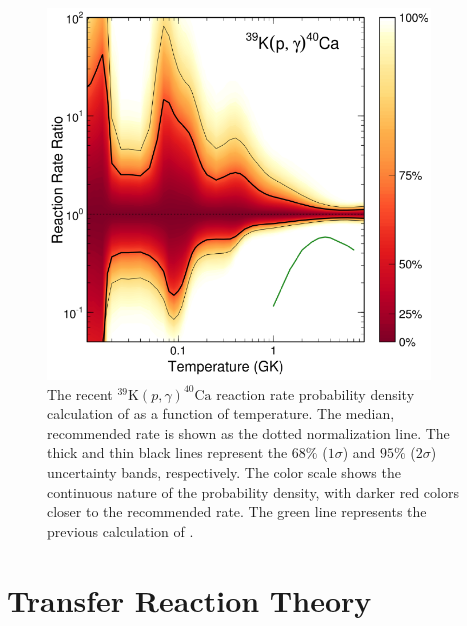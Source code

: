 \begin{figure}[t]
\centering
\includegraphics[width=4in]{Chapter-6/figs/39K_p_g_Longland2018.png}
\caption{\label{fig:39K_p_g_Longland}The recent $^{39}\mathrm{K}(p,\gamma)^{40}\mathrm{Ca}$ reaction rate probability density calculation of \cite{Longland2018} as a function of temperature. The median, recommended rate is shown as the dotted normalization line. The thick and thin black lines represent the $68\%$ ($1\sigma$) and $95\%$ ($2\sigma$) uncertainty bands, respectively. The color scale shows the continuous nature of the probability density, with darker red colors closer to the recommended rate. The green line represents the previous calculation of \cite{Cheng1981}.}
\end{figure}





\section{Transfer Reaction Theory}


